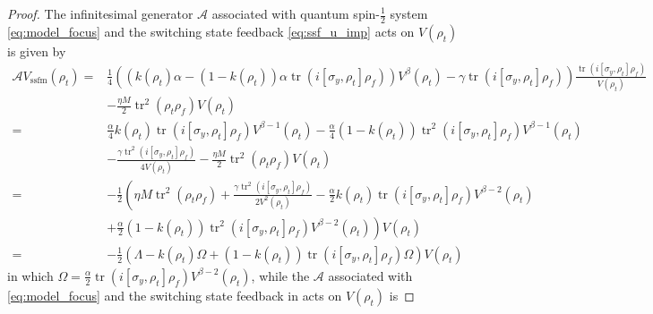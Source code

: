 \documentclass[]{elsarticle}
\begin{document}
\begin{proof}
	The infinitesimal generator $\mathcal{A}$ associated with quantum spin-$\frac{1}{2}$ system \eqref{eq:model_focus} and the switching state feedback \eqref{eq:ssf_u_imp} acts on $V(\rho_{t})$ is given by
	\begin{equation}\label{eq:LV_sf}
		\begin{aligned}
			\mathcal{A}V_{\mathrm{ssfm}}\left(\rho_{t}\right)
			=&\frac{1}{4}\left(\left(k\left(\rho_{t}\right)\alpha-\left(1-k\left(\rho_{t}\right)\right)\alpha \operatorname{tr}\left(i\left[\sigma_{y}, \rho_{t}\right] \rho_f\right)\right)V^{\beta}\left(\rho_{t}\right)-\gamma \operatorname{tr}\left(i\left[\sigma_{y}, \rho_{t}\right] \rho_f\right)\right) \frac{\operatorname{tr}\left(i\left[\sigma_{y}, \rho_{t}\right] {\rho_f}\right)}{V\left(\rho_{t}\right)}\\
			&-\frac{\eta M}{2}\operatorname{tr}^2\left(\rho_{t} {\rho_f}\right) V\left(\rho_{t}\right)\\
			=&\frac{\alpha}{4}k\left(\rho_{t}\right)\operatorname{tr}\left(i\left[\sigma_{y}, \rho_{t}\right] {\rho_f}\right)V^{\beta-1}\left(\rho_{t}\right)
			-\frac{\alpha}{4}\left(1-k\left(\rho_{t}\right)\right)\operatorname{tr}^2\left(i\left[\sigma_{y}, \rho_{t}\right] {\rho_f}\right)	V^{\beta-1}\left(\rho_{t}\right)\\
			&-\frac{\gamma\operatorname{tr}^2\left(i\left[\sigma_{y}, \rho_{t}\right] {\rho_f}\right)}{4V\left(\rho_{t}\right)}-\frac{\eta M}{2}\operatorname{tr}^{2}\left(\rho_{t} {\rho_f}\right) V\left(\rho_{t}\right)\\
			=&-\frac{1}{2}\left({\eta M}\operatorname{tr}^{2}\left(\rho_{t} {\rho_f}\right)+\frac{\gamma\operatorname{tr}^2\left(i\left[\sigma_{y}, \rho_{t}\right] {\rho_f}\right)}{2V^2\left(\rho_{t}\right)}
			-\frac{\alpha}{2}k\left(\rho_{t}\right)\operatorname{tr}\left(i\left[\sigma_{y}, \rho_{t}\right] {\rho_f}\right) V^{\beta-2}\left(\rho_{t}\right)\right.\\
			&\left.+\frac{\alpha}{2}\left(1-k\left(\rho_{t}\right)\right)\operatorname{tr}^2\left(i\left[\sigma_{y}, \rho_{t}\right] {\rho_f}\right)	V^{\beta-2}\left(\rho_{t}\right)\right)V\left(\rho_{t}\right)\\
			=&-\frac{1}{2}\left(\Lambda-k\left(\rho_{t}\right)\Omega+\left(1-k\left(\rho_{t}\right)\right)\operatorname{tr}\left(i\left[\sigma_{y}, \rho_{t}\right] {\rho_f}\right)\Omega\right)V\left(\rho_{t}\right)
		\end{aligned}
	\end{equation}
	in which $\Omega=\frac{\alpha}{2}\operatorname{tr}\left(i\left[\sigma_{y}, \rho_{t}\right] {\rho_f}\right) V^{\beta-2}\left(\rho_{t}\right)$, while the $\mathcal{A}$ associated with \eqref{eq:model_focus} and the switching state feedback in \cite{WSJZJ2021b} acts on $V(\rho_{t})$ is

\end{proof}
\end{document}
